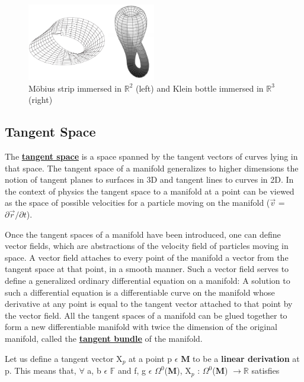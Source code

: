 \begin{figure}[ht]
    \begin{center}
        \includegraphics[width=0.5\textwidth]{figures/moebius-klien.png}
        \caption{Möbius strip immersed in $\mathbb{R}^{2}$ (left) and Klein bottle immersed in $\mathbb{R}^{3}$ (right)}
    \end{center}
\end{figure}

\subsection{Tangent Space}\label{Tangent Space}
The \href{https://en.wikipedia.org/wiki/Tangent_space}{\textbf{tangent space}} is a space spanned by
the tangent vectors of curves lying in that space. The tangent space of a manifold generalizes to higher dimensions 
the notion of tangent planes to surfaces in 3D and tangent lines to curves in 2D. 
In the context of physics the tangent space to a manifold at a point can be viewed as the space of possible velocities 
for a particle moving on the manifold ($\overrightarrow{v}$ = $\partial \overrightarrow{r}/ \partial t$).

Once the tangent spaces of a manifold have been introduced, one can define vector fields, which are abstractions of the velocity field of particles moving in space. 
A vector field attaches to every point of the manifold a vector from the tangent space at that point, in a smooth manner. 
Such a vector field serves to define a generalized ordinary differential equation on a manifold: 
A solution to such a differential equation is a differentiable curve on the manifold whose derivative at any point is equal to the 
tangent vector attached to that point by the vector field. 
All the tangent spaces of a manifold can be glued together to form a new differentiable manifold
with twice the dimension of the original manifold, called the \href{https://en.wikipedia.org/wiki/Tangent_bundle}{\textbf{tangent bundle}}
of the manifold.

Let us define a tangent vector X$_p$ at a point p $\epsilon$ \textbf{M} to be a \textbf{linear derivation} at p. 
This means that, $\forall$ a, b $\epsilon$ $\mathbb{F}$ and
f, g $\epsilon$ $\Omega^0$(\textbf{M}), X$_p$ : $\Omega^0$(\textbf{M}) $\rightarrow \mathbb{R}$ satisfies

